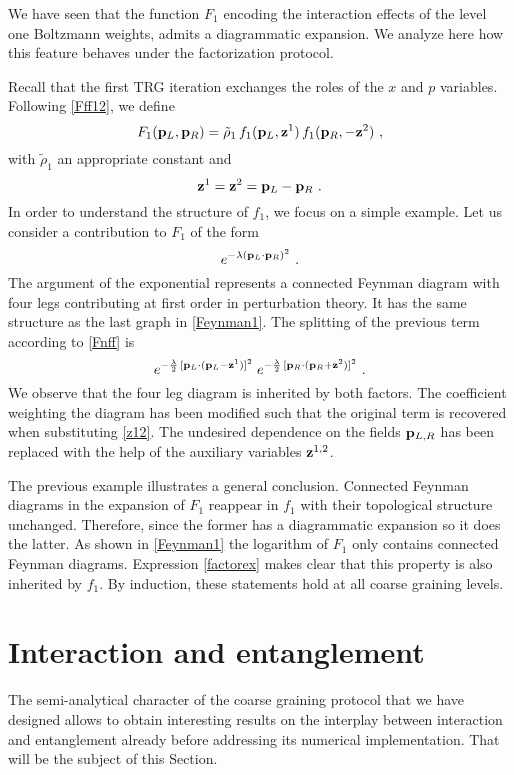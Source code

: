 \documentclass[a4paper,preprintnumbers,nofootinbib,twocolumn]{quantumarticle}
\newcommand{\be}{\begin{equation}} \newcommand{\ee}{\end{equation}}
\begin{document}
We have seen that the function $F_1$ encoding the interaction effects of the level one Boltzmann weights, admits a diagrammatic expansion. We analyze here how this feature behaves under the factorization protocol.

Recall that the first TRG iteration exchanges the roles of the $x$ and $p$ variables. Following \eqref{Fff12}, we define
\be  
F_1({\bf p}_L, {\bf p}_R)= {\tilde \rho}_1 \, f_1({\bf p}_L,{\bf z}^1 ) \, f_1({\bf p}_R,-{\bf z}^2 ) \ , 
\label{Fnff}
\ee
with ${\tilde \rho}_1$ an appropriate constant and
\be
{\bf z}^1={\bf z}^2={\bf p}_L-{\bf p}_R \ .
\label{z12}
\ee
In order to understand the structure of $f_1$, we focus on a simple example.
Let us consider a contribution to $F_1$ of the form
\be
e^{- \lambda  ({\bf p}_L \cdot {\bf p}_R )^2} \ . 
\ee
The argument of the exponential represents a connected Feynman diagram with four legs contributing at first order in perturbation theory. It has the same structure as
the last graph in \eqref{Feynman1}.
The splitting of the previous term according to \eqref{Fnff} is
\be
e^{- {\lambda \over 2}   \, [{\bf p}_L \cdot ({\bf p}_L- {\bf z}^1)]^2} \; e^{- {\lambda \over 2}  \, [{\bf p}_R\cdot ({\bf p}_R+{\bf z}^2 ) ]^2} \ .
\label{factorex}
\ee
We observe that the four leg diagram is inherited by both factors. The coefficient weighting the diagram has been modified such that the original term is recovered when substituting \eqref{z12}. 
The undesired dependence on the fields ${\bf p}_{L,R}$ has been replaced with the help of the auxiliary variables ${\bf z}^{1,2}$.

The previous example illustrates a general conclusion. Connected Feynman diagrams in the expansion of $F_1$ reappear in $f_1$ with their topological structure unchanged.
Therefore, since the former has a diagrammatic expansion so it does the latter. 
As shown in \eqref{Feynman1} the logarithm of $F_1$ only contains connected Feynman diagrams. Expression \eqref{factorex} makes clear that this property is also inherited by $f_1$. 
By induction, these statements hold at all coarse graining levels.

\section{Interaction and entanglement}

The semi-analytical character of the coarse graining protocol that we have designed allows to obtain interesting results on the interplay between interaction and entanglement already before addressing its numerical implementation.
That will be the subject of this Section.
\end{document}
